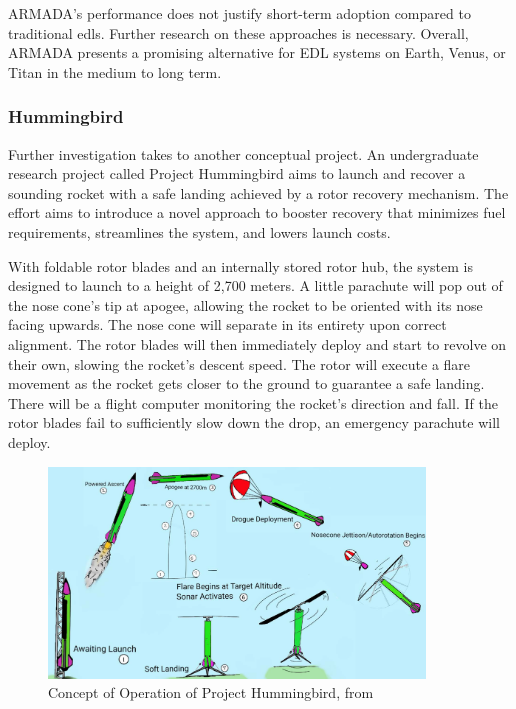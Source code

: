 ARMADA's performance does not justify short-term adoption compared to traditional \gls{edls}. Further research on these approaches is necessary. Overall, ARMADA presents a promising alternative for EDL systems on Earth, Venus, or Titan in the medium to long term.



\subsubsection{Hummingbird}

Further investigation takes to another conceptual project. An undergraduate research project called Project Hummingbird \cite{maurer_project_nodate} aims to launch and recover a sounding rocket with a safe landing achieved by a rotor recovery mechanism. The effort aims to introduce a novel approach to booster recovery that minimizes fuel requirements, streamlines the system, and lowers launch costs.

With foldable rotor blades and an internally stored rotor hub, the system is designed to launch to a height of 2,700 meters. A little parachute will pop out of the nose cone's tip at apogee, allowing the rocket to be oriented with its nose facing upwards. The nose cone will separate in its entirety upon correct alignment. The rotor blades will then immediately deploy and start to revolve on their own, slowing the rocket's descent speed. The rotor will execute a flare movement as the rocket gets closer to the ground to guarantee a safe landing. There will be a flight computer monitoring the rocket's direction and fall. If the rotor blades fail to sufficiently slow down the drop, an emergency parachute will deploy.

\begin{figure}[!htb]
    \centering
    \includegraphics[width=10cm]{Figures/literature_review/Hummingbird_operation.png}
    \caption{Concept of Operation of Project Hummingbird, from \cite{maurer_project_nodate}}
    \label{fig:Hummingbird_operation}
\end{figure}

